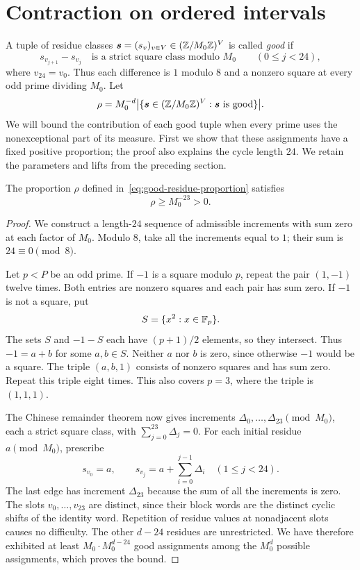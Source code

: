 \section{Contraction on ordered intervals}
\label{sec:ordered-contraction}

A tuple of residue classes
\(\boldsymbol s=(s_v)_{v\in V}\in(\mathbb Z/M_0\mathbb Z)^V\) is called
\emph{good} if
\[
 s_{v_{j+1}}-s_{v_j}
 \quad\text{is a strict square class modulo }M_0
 \qquad(0\le j<24),
\]
where \(v_{24}=v_0\). Thus each difference is \(1\) modulo \(8\)
and a nonzero square at every odd prime dividing \(M_0\). Let
\begin{equation}
 \rho=M_0^{-d}\bigl|\{\boldsymbol s\in(\mathbb Z/M_0\mathbb Z)^V:
                         \boldsymbol s\text{ is good}\}\bigr|.
 \label{eq:good-residue-proportion}
\end{equation}
We will bound the contribution of each good tuple when every prime uses
the nonexceptional part of its measure. First we show that these assignments
have a fixed positive proportion; the proof also explains the cycle length
$24$. We retain the parameters and lifts from the preceding section.

\begin{lemma}
\label{lem:good-residues}
The proportion $\rho$ defined in~\eqref{eq:good-residue-proportion} satisfies
\[
 \rho\ge M_0^{-23}>0.
\]
\end{lemma}

\begin{proof}
We construct a length-$24$ sequence of admissible increments with sum zero at
each factor of $M_0$.  Modulo $8$, take all the increments equal to $1$; their
sum is $24\equiv0\pmod8$.

Let $p<P$ be an odd prime.  If $-1$ is a square modulo $p$, repeat the pair
$(1,-1)$ twelve times.  Both entries are nonzero squares and each pair has sum
zero.  If $-1$ is not a square, put
\[
 S=\{x^2:x\in\mathbb F_p\}.
\]
The sets $S$ and $-1-S$ each have $(p+1)/2$ elements, so they intersect.
Thus $-1=a+b$ for some $a,b\in S$.  Neither $a$ nor $b$ is zero, since otherwise
$-1$ would be a square.  The triple $(a,b,1)$ consists of nonzero squares and
has sum zero.  Repeat this triple eight times.  This also covers $p=3$, where
the triple is $(1,1,1)$.

The Chinese remainder theorem now gives increments
$\Delta_0,\ldots,\Delta_{23}\pmod{M_0}$, each a strict square class, with
$\sum_{j=0}^{23}\Delta_j=0$.  For each initial residue $a\pmod{M_0}$, prescribe
\[
 s_{v_0}=a,\qquad
 s_{v_j}=a+\sum_{i=0}^{j-1}\Delta_i\quad(1\le j<24).
\]
The last edge has increment $\Delta_{23}$ because the sum of all the increments is
zero.  The slots $v_0,\ldots,v_{23}$ are distinct, since their block words are
the distinct cyclic shifts of the identity word.  Repetition of residue
values at nonadjacent slots causes no difficulty.  The other $d-24$ residues
are unrestricted.  We have therefore exhibited at least
$M_0\cdot M_0^{d-24}$ good assignments among the $M_0^d$ possible assignments,
which proves the bound.
\end{proof}

